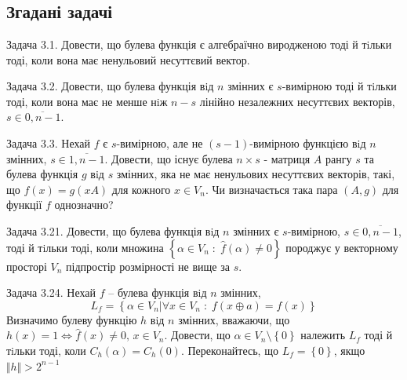 \appendix
\chapter{}
\label{append:1}
\section{Згадані задачі}
\indent Задача 3.1. Довести, що булева функція є алгебраїчно виродженою тоді й тiльки тоді, коли вона має ненульовий 
несуттєвий вектор.

Задача 3.2. Довести, що булева функція вiд $n$ змінних є $s$-вимірною тоді й тiльки тоді, коли вона має не менше 
нiж $n-s$ лінійно незалежних несуттєвих векторів, $s \in \overline{0, n-1}$.

Задача 3.3. Нехай $f$ є $s$-вимірною, але не $(s-1)$-вимірною функцією вiд $n$ змінних, $s \in \overline{1, n-1}$. 
Довести, що існує булева $n \times s$ - матриця $A$ рангу $s$ та булева функція $g$ вiд $s$ змінних, яка не має 
ненульових несуттєвих векторів, такі, що $f(x) = g(xA)$ для кожного $x \in V_{n}$. Чи визначається така пара $(A, g)$ 
для функції $f$ однозначно?

Задача 3.21. Довести, що булева функція вiд $n$ змінних є $s$-вимірною, $s \in \overline{0, n-1}$, тоді й тiльки 
тоді, коли множина $\left\{\alpha \in V_{n} \; : \; \hat{f}(\alpha) \neq 0\right\}$ породжує у векторному просторі 
$V_{n}$ підпростір розмірності не вище за $s$.

Задача 3.24. Нехай $f$ -- булева функція вiд $n$ змінних,
\begin{equation*}
    L_{f} = \left\{\alpha \in V_{n} \vert \forall x \in V_{n} \; : \; f(x \oplus a) = f(x)\right\}
\end{equation*}
Визначимо булеву функцію $h$ вiд $n$ змінних, вважаючи, що 
$h(x) = 1 \Leftrightarrow \hat{f}(x) \neq 0, \, x \in V_{n}$. Довести, що $\alpha \in V_{n}\setminus\left\{0\right\}$ 
належить $L_{f}$ тоді й тiльки тоді, коли $C_{h}(\alpha) = C_{h}(0)$. Переконайтесь, що $L_{f} = \left\{0\right\}$, 
якщо $\Vert h \Vert > 2^{n-1}$
